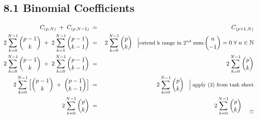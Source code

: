 \documentclass[10pt,a4paper]{article}
\begin{document}
\pagestyle{fancy}

\subsection*{8.1 Binomial Coefficients}

\begin{eqnarray}C_{(p,N)}\;+\;C_{(p,N-1)}\;&=&\;C_{(p+1,N)} \\
2 \sum_{k=0}^{N-1} {p-1 \choose k} \;+\; 2 \sum_{k=1}^{N-1} {p-1 \choose k-1} \;&=&\; 2 \sum_{k=0}^{N-1} {p \choose k} \;\;\;\Big{|}\mbox{\small{extend k range in $2^{nd}$ sum:}} {n \choose -1} = 0\; \forall\; n \in \mathbb{N} \\
2 \sum_{k=0}^{N-1} {p-1 \choose k} \;+\; 2 \sum_{k=0}^{N-1} {p-1 \choose k-1}  \;&=&\; 2 \sum_{k=0}^{N-1} {p \choose k} \\
2 \sum_{k=0}^{N-1}\Big{[} {p-1 \choose k} \;+\; {p-1 \choose k-1} \Big{]} \;&=&\; 2 \sum_{k=0}^{N-1} {p \choose k} \;\;\;\Big{|} \; \mbox{\small{apply (2) from task sheet}} \\
2 \sum_{k=0}^{N-1} {p \choose k} \;&=&\; 2 \sum_{k=0}^{N-1} {p \choose k}_{\tiny{\qed}}
\end{eqnarray}
\noindent

\end{document}
